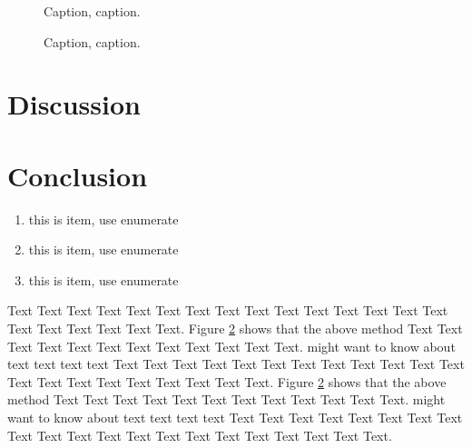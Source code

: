 \documentclass{bioinfo}
\begin{document}
\begin{figure}[!tpb]%
\caption{Caption, caption.}\label{fig:01}
\end{figure}

\begin{figure}[!tpb]%
\caption{Caption, caption.}\label{fig:02}
\end{figure}

\section{Discussion}










%
%






\section{Conclusion}



\begin{enumerate}
\item this is item, use enumerate
\item this is item, use enumerate
\item this is item, use enumerate
\end{enumerate}

Text Text Text Text Text Text  Text Text Text Text Text Text Text Text Text  Text Text Text Text Text Text. Figure \ref{fig:02} shows that the above method  Text Text Text Text  Text Text Text Text Text Text  Text Text.  \citealp{Boffelli03} might want to know about  text text text text
Text Text Text Text Text Text  Text Text Text Text Text Text Text Text Text  Text Text Text Text Text Text. Figure \ref{fig:02} shows that the above method  Text Text Text Text  Text Text Text Text Text Text  Text Text.  \citealp{Boffelli03} might want to know about  text text text text
Text Text Text Text Text Text  Text Text Text Text Text Text Text Text Text  Text Text Text Text Text Text.
\end{document}
